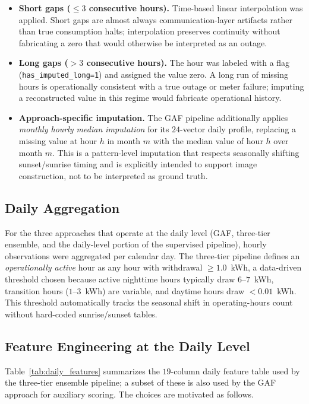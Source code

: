 \documentclass{article}
\begin{document}
\begin{itemize}[leftmargin=1.5em,itemsep=1pt]
  \item \textbf{Short gaps ($\leq 3$ consecutive hours).} Time-based linear interpolation was applied. Short gaps are almost always communication-layer artifacts rather than true consumption halts; interpolation preserves continuity without fabricating a zero that would otherwise be interpreted as an outage.
  \item \textbf{Long gaps ($>3$ consecutive hours).} The hour was labeled with a flag (\texttt{has\_imputed\_long=1}) and assigned the value zero. A long run of missing hours is operationally consistent with a true outage or meter failure; imputing a reconstructed value in this regime would fabricate operational history.
  \item \textbf{Approach-specific imputation.} The GAF pipeline additionally applies \emph{monthly hourly median imputation} for its $24$-vector daily profile, replacing a missing value at hour $h$ in month $m$ with the median value of hour $h$ over month $m$. This is a pattern-level imputation that respects seasonally shifting sunset/sunrise timing and is explicitly intended to support image construction, not to be interpreted as ground truth.
\end{itemize}

\subsection{Daily Aggregation}
For the three approaches that operate at the daily level (GAF, three-tier ensemble, and the daily-level portion of the supervised pipeline), hourly observations were aggregated per calendar day. The three-tier pipeline defines an \emph{operationally active} hour as any hour with withdrawal $\geq 1.0$~kWh, a data-driven threshold chosen because active nighttime hours typically draw $6$--$7$~kWh, transition hours ($1$--$3$~kWh) are variable, and daytime hours draw $<0.01$~kWh. This threshold automatically tracks the seasonal shift in operating-hours count without hard-coded sunrise/sunset tables.

\subsection{Feature Engineering at the Daily Level}
Table~\ref{tab:daily_features} summarizes the $19$-column daily feature table used by the three-tier ensemble pipeline; a subset of these is also used by the GAF approach for auxiliary scoring. The choices are motivated as follows.
\end{document}
